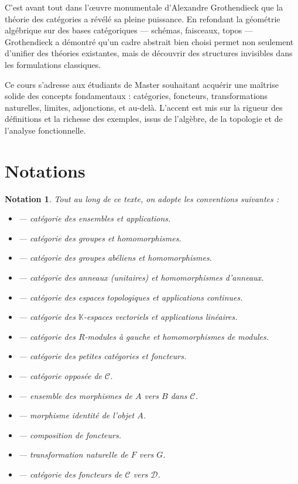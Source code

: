 \documentclass[a4paper,12pt]{book}
\DeclareMathOperator{\Hom}{Hom}
\DeclareMathOperator{\Set}{\mathbf{Set}}
\DeclareMathOperator{\Grp}{\mathbf{Grp}}
\DeclareMathOperator{\Ab}{\mathbf{Ab}}
\DeclareMathOperator{\Ring}{\mathbf{Ring}}
\DeclareMathOperator{\Top}{\mathbf{Top}}
\DeclareMathOperator{\Vect}{\mathbf{Vect}}
\DeclareMathOperator{\Mod}{\mathbf{Mod}}
\DeclareMathOperator{\Cat}{\mathbf{Cat}}
\newcommand{\op}{\mathrm{op}}
\newcommand{\id}{\mathrm{id}}
\newcommand{\K}{\mathbb{K}}
\newtheorem*{notation}{Notation}
\begin{document}
C'est avant tout dans l'\oe uvre monumentale d'Alexandre Grothendieck que la théorie des catégories a révélé sa pleine puissance. En refondant la géométrie algébrique sur des bases catégoriques --- schémas, faisceaux, topos --- Grothendieck a démontré qu'un cadre abstrait bien choisi permet non seulement d'unifier des théories existantes, mais de découvrir des structures invisibles dans les formulations classiques.

Ce cours s'adresse aux étudiants de Master souhaitant acquérir une maîtrise solide des concepts fondamentaux : catégories, foncteurs, transformations naturelles, limites, adjonctions, et au-delà. L'accent est mis sur la rigueur des définitions et la richesse des exemples, issus de l'algèbre, de la topologie et de l'analyse fonctionnelle.

\bigskip

\chapter*{Notations}

\begin{notation}
Tout au long de ce texte, on adopte les conventions suivantes :
\begin{itemize}[leftmargin=2cm]
  \item[$\Set$] --- catégorie des ensembles et applications.
  \item[$\Grp$] --- catégorie des groupes et homomorphismes.
  \item[$\Ab$] --- catégorie des groupes abéliens et homomorphismes.
  \item[$\Ring$] --- catégorie des anneaux (unitaires) et homomorphismes d'anneaux.
  \item[$\Top$] --- catégorie des espaces topologiques et applications continues.
  \item[$\Vect_\K$] --- catégorie des $\K$-espaces vectoriels et applications linéaires.
  \item[$R\text{-}\Mod$] --- catégorie des $R$-modules à gauche et homomorphismes de modules.
  \item[$\Cat$] --- catégorie des petites catégories et foncteurs.
  \item[$\mathcal{C}^{\op}$] --- catégorie opposée de $\mathcal{C}$.
  \item[$\Hom_{\mathcal{C}}(A,B)$] --- ensemble des morphismes de $A$ vers $B$ dans $\mathcal{C}$.
  \item[$\id_A$] --- morphisme identité de l'objet $A$.
  \item[$F \circ G$] --- composition de foncteurs.
  \item[$\alpha : F \Rightarrow G$] --- transformation naturelle de $F$ vers $G$.
  \item[{$[\mathcal{C}, \mathcal{D}]$}] --- catégorie des foncteurs de $\mathcal{C}$ vers $\mathcal{D}$.
\end{itemize}
\end{notation}
\end{document}
